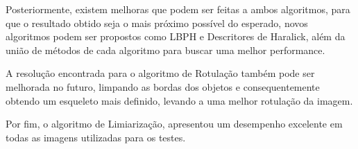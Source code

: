 \documentclass[conference, brazil]{IEEEtran}
\begin{document}
Posteriormente, existem melhoras que podem ser feitas a ambos algoritmos, para que o resultado obtido seja o mais próximo possível do esperado, novos algoritmos podem ser propostos como LBPH e Descritores de Haralick, além da união de métodos de cada algoritmo para buscar uma melhor performance.
  
A resolução encontrada para o algoritmo de Rotulação também pode ser melhorada no futuro, limpando as bordas dos objetos e consequentemente obtendo um esqueleto mais definido, levando a uma melhor rotulação da imagem.

Por fim, o algoritmo de Limiarização, apresentou um desempenho excelente em todas as imagens utilizadas para os testes.





\end{document}
